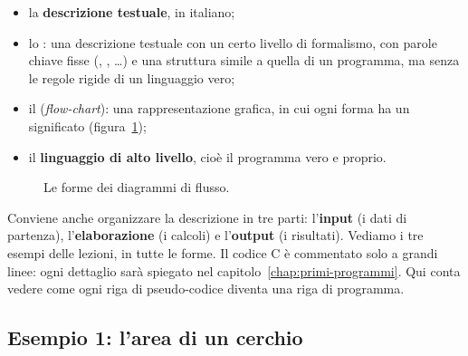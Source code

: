 \begin{itemize}
  \item la \textbf{descrizione testuale}, in italiano;
  \item lo : una descrizione testuale con un certo
        livello di formalismo, con parole chiave fisse (,
        , \dots) e una struttura simile a quella di un
        programma, ma senza le regole rigide di un linguaggio vero;
  \item il  (\textit{flow-chart}): una
        rappresentazione grafica, in cui ogni forma ha un significato
        (figura~\ref{fig:forme});
  \item il \textbf{linguaggio di alto livello}, cioè il programma vero e
        proprio.
\end{itemize}

\begin{figure}[H]
  \centering
  \caption{Le forme dei diagrammi di flusso.}
  \label{fig:forme}
\end{figure}

Conviene anche organizzare la descrizione in tre parti: l'\textbf{input}
(i dati di partenza), l'\textbf{elaborazione} (i calcoli) e
l'\textbf{output} (i risultati). Vediamo i tre esempi delle lezioni, in
tutte le forme. Il codice C è commentato solo a grandi linee: ogni
dettaglio sarà spiegato nel capitolo~\ref{chap:primi-programmi}. Qui conta
vedere come ogni riga di pseudo-codice diventa una riga di programma.

\subsection{Esempio 1: l'area di un cerchio}

